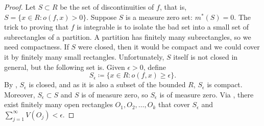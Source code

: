 \begin{proof}
Let $S \subset R$ be the set of discontinuities of $f$, that is,
$S = \bigl\{ x \in R : o(f,x) > 0 \bigr\}$.
Suppose $S$ is a measure zero set: $m^*(S) = 0$.
The trick to proving that $f$ is integrable is to isolate the bad set
into a small set of subrectangles of a partition.  A partition has
finitely many subrectangles, so we need
compactness.  If $S$ were closed, then it would be compact and we could cover
it by finitely many small rectangles.  Unfortunately, $S$
itself is not closed in general, but the following set is.
Given $\epsilon > 0$, define
\begin{equation*}
S_\epsilon \coloneqq \bigl\{ x \in R : o(f,x) \geq \epsilon \bigr\} .
\end{equation*}
By , $S_\epsilon$ is closed,
and as it is also a subset of the bounded $R$,
$S_\epsilon$ is compact.  Moreover,
$S_\epsilon \subset S$ and $S$ is of measure zero,
so $S_\epsilon$ is of measure zero.
Via , there exist finitely many open rectangles
$O_1,O_2,\ldots,O_k$ that cover $S_\epsilon$ and
$\sum_{j=1}^\infty V(O_j) < \epsilon$.  


\end{proof}
